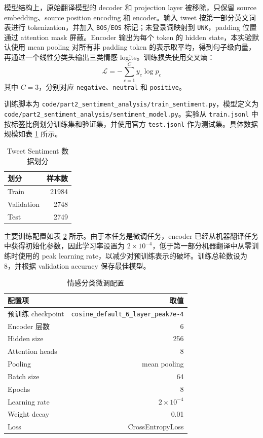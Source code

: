 ﻿\documentclass[UTF8,a4paper,12pt]{ctexart}
\begin{document}
模型结构上，原始翻译模型的 decoder 和 projection layer 被移除，只保留 source embedding、source position encoding 和 encoder。输入 tweet 按第一部分英文词表进行 tokenization，并加入 \texttt{BOS}/\texttt{EOS} 标记；未登录词映射到 \texttt{UNK}，padding 位置通过 attention mask 屏蔽。Encoder 输出为每个 token 的 hidden state，本实验默认使用 mean pooling 对所有非 padding token 的表示取平均，得到句子级向量，再通过一个线性分类头输出三类情感 logits。训练损失使用交叉熵：
\[
\mathcal{L}=-\sum_{c=1}^{C} y_c \log p_c
\]
其中 $C=3$，分别对应 \texttt{negative}、\texttt{neutral} 和 \texttt{positive}。

训练脚本为 \texttt{code/part2\_sentiment\_analysis/train\_sentiment.py}，模型定义为 \texttt{code/part2\_sentiment\_analysis/sentiment\_model.py}。实验从 \texttt{train.jsonl} 中按标签比例划分训练集和验证集，并使用官方 \texttt{test.jsonl} 作为测试集。具体数据规模如表 \ref{tab:sentiment-data} 所示。

\begin{table}[H]
\centering
\caption{Tweet Sentiment 数据划分}
\label{tab:sentiment-data}
\begin{tabular}{lr}
\toprule
划分 & 样本数 \\
\midrule
Train & 21984 \\
Validation & 2748 \\
Test & 2749 \\
\bottomrule
\end{tabular}
\end{table}

主要训练配置如表 \ref{tab:sentiment-config} 所示。由于本任务是微调任务，encoder 已经从机器翻译任务中获得初始化参数，因此学习率设置为 $2\times10^{-4}$，低于第一部分机器翻译中从零训练时使用的 peak learning rate，以减少对预训练表示的破坏。训练总轮数设为 8，并根据 validation accuracy 保存最佳模型。

\begin{table}[H]
\centering
\caption{情感分类微调配置}
\label{tab:sentiment-config}
\begin{tabular}{lr}
\toprule
配置项 & 取值 \\
\midrule
预训练 checkpoint & \texttt{cosine\_default\_6\_layer\_peak7e-4} \\
Encoder 层数 & 6 \\
Hidden size & 256 \\
Attention heads & 8 \\
Pooling & mean pooling \\
Batch size & 64 \\
Epochs & 8 \\
Learning rate & $2\times10^{-4}$ \\
Weight decay & 0.01 \\
Loss & CrossEntropyLoss \\
\bottomrule
\end{tabular}
\end{table}
\end{document}
